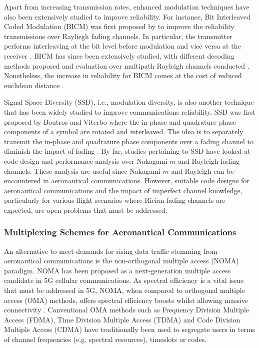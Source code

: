 Apart from increasing transmission rates, enhanced modulation techniques have also been extensively studied to improve reliability. For instance, Bit Interleaved Coded Modulation (BICM) was first proposed by \cite{zehavi19928} to improve the reliability transmissions over Rayliegh fading channels. In particular, the transmitter performs interleaving at the bit level before modulation and vice versa at the receiver \cite{zehavi19928,caire1998bit,li2002bit,zhan2017differential}. BICM has since been extensively studied, with different decoding methods proposed \cite{li2002bit,abotabl2017broadcast} and evaluation over multipath Rayleigh channels conducted \cite{zhan2017differential}. Nonetheless, the increase in reliability for BICM comes at the cost of reduced euclidean distance \cite{li2002bit}.

Signal Space Diversity (SSD), i.e., modulation diversity, is also another technique that has been widely studied to improve communications reliability. SSD was first proposed by Boutros and Viterbo \cite{boutros1998signal} where the in-phase and quadrature phase components of a symbol are rotated and interleaved. The idea is to separately transmit the in-phase and quadrature phase components over a fading channel to diminish the impact of fading \cite{boutros1998signal}. By far, studies pertaining to SSD have looked at code design \cite{mohammed2012modulation} and performance analysis over Nakagami-$m$ \cite{lu2012bit} and Rayleigh \cite{sokun2017spectrally} fading channels. These analysis are useful since Nakagami-$m$ and Rayleigh can be encountered in aeronautical communications. However, suitable code designs for aeronautical communications and the impact of imperfect channel knowledge, particularly for various flight scenarios where Rician fading channels are expected, are open problems that must be addressed.

\subsubsection{Multiplexing Schemes for Aeronautical Communications}

An alternative to meet demands for rising data traffic stemming from aeronautical communications is the non-orthogonal multiple access (NOMA) paradigm. NOMA has been proposed as a next-generation multiple access candidate \cite{dai2015non} in 5G cellular communications. As spectral efficiency is a vital issue that must be addressed in 5G, NOMA, when compared to orthogonal multiple access (OMA) methods, offers spectral efficiency boosts whilst allowing massive connectivity \cite{dai2015non}. Conventional OMA methods such as Frequency Division Multiple Access (FDMA), Time Division Multiple Access (TDMA) and Code Division Multiple Access (CDMA) have traditionally been used to segregate users in terms of channel frequencies (e.g. spectral resources), timeslots or codes. 


